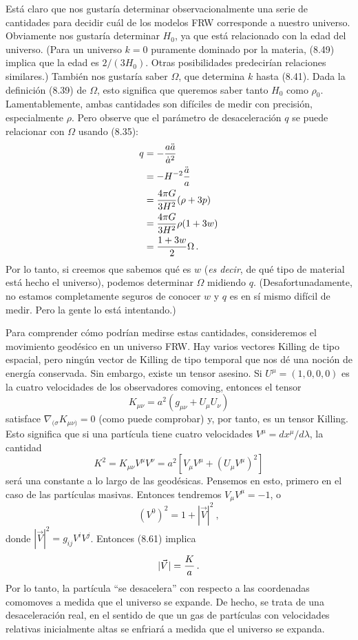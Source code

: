 \documentclass[11pt,b5paper,openany,twoside]{book}
\newcommand{\mn}{{\mu\nu}}
\begin{document}
Está claro que nos gustaría determinar observacionalmente una serie de cantidades para decidir cuál de los modelos FRW corresponde a nuestro universo.
Obviamente nos gustaría determinar $H_0$, ya que está relacionado con la edad del universo.
(Para un universo $k=0$ puramente dominado por la materia, (8.49) implica que la edad es $2/(3H_0)$.
Otras posibilidades predecirían relaciones similares.)
También nos gustaría saber $\Omega$, que determina $k$ hasta (8.41).
Dada la definición (8.39) de $\Omega$, esto significa que queremos saber tanto $H_0$ como $\rho_0$.
Lamentablemente, ambas cantidades son difíciles de medir con precisión, especialmente $\rho$.
Pero observe que el parámetro de desaceleración $q$ se puede relacionar con $\Omega$ usando (8.35):
\begin{align}
q  &=  -{{a\ddot a}\over {\dot a^2}} \notag \\
&=  -H^{-2}{{\ddot a}\over a} \notag \\
&=  {{4\pi G}\over {3H^2}}(\rho+3p) \notag \\
&=  {{4\pi G}\over {3H^2}}\rho(1+3w) \notag \\
&=  {{1+3w}\over 2}\Omega\,.\label{8.60}
\end{align}
Por lo tanto, si creemos que sabemos qué es $w$ ({\it es decir}, de qué tipo de material está hecho el universo), podemos determinar $\Omega$ midiendo $q$.
(Desafortunadamente, no estamos completamente seguros de conocer $w$ y $q$ es en sí mismo difícil de medir.
Pero la gente lo está intentando.)

Para comprender cómo podrían medirse estas cantidades, consideremos el movimiento geodésico en un universo FRW.
Hay varios vectores Killing de tipo espacial, pero ningún vector de Killing de tipo temporal que nos dé una noción de energía conservada.
Sin embargo, existe un tensor asesino.
Si $U^\mu=(1,0,0,0)$ es la cuatro velocidades de los observadores comoving, entonces el tensor
\begin{equation}
K_\mn = a^2(g_\mn + U_\mu U_\nu)\label{8.61}
\end{equation}
satisface $\nabla_{(\sigma}K_{\mn)}=0$ (como puede comprobar) y, por tanto, es un tensor Killing.
Esto significa que si una partícula tiene cuatro velocidades $V^\mu = dx^\mu/d\lambda$, la cantidad
\begin{equation}
K^2 = K_\mn V^\mu V^\nu = a^2[V_\mu V^\mu + (U_\mu V^\mu)^2]\label{8.62}
\end{equation}
será una constante a lo largo de las geodésicas.
Pensemos en esto, primero en el caso de las partículas masivas.
Entonces tendremos $V_\mu V^\mu =-1$, o
\begin{equation}
(V^0)^2 = 1+|\vec V|^2\ ,\label{8.63}
\end{equation}
donde $|\vec V|^2 = g_{ij}V^iV^j$.
Entonces (8.61) implica
\begin{equation}
|\vec V| = {{K}\over a}\,.\label{8.64}
\end{equation}
Por lo tanto, la partícula ``se desacelera'' con respecto a las coordenadas comomoves a medida que el universo se expande.
De hecho, se trata de una desaceleración real, en el sentido de que un gas de partículas con velocidades relativas inicialmente altas se enfriará a medida que el universo se expanda.
\end{document}
